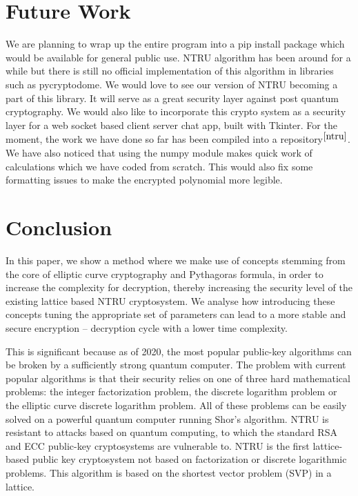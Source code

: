 \documentclass[a4paper,12pt]{article}
\begin{document}
\section{Future Work}
\begin{flushleft}
We are planning to wrap up the entire program into a pip install package which would be available for general public use. NTRU algorithm has been around for a while but there is still no official implementation of this algorithm in libraries such as pycryptodome. We would love to see our version of NTRU becoming a part of this library. It will serve as a great security layer against post quantum cryptography. We would also like to incorporate this crypto system as a security layer for a web socket based client server chat app, built with Tkinter. For the moment, the work we have done so far has been compiled into a repository$^{\cite{ntru}}$. We have also noticed that using the numpy module makes quick work of calculations which we have coded from scratch. This would also fix some formatting issues to make the encrypted polynomial more legible.
\end{flushleft}

\section{Conclusion}
\begin{flushleft}
    In this paper, we show a method where we make use of concepts stemming from the core of elliptic curve cryptography and Pythagoras formula, in order to increase the complexity for decryption, thereby increasing the security level of the existing lattice based NTRU cryptosystem. We analyse how introducing these concepts tuning the appropriate set of parameters can lead to a more stable and secure encryption – decryption cycle with a lower time complexity.
\end{flushleft}

\begin{flushleft}
	This is significant because as of 2020, the most popular public-key algorithms can be broken by a sufficiently strong quantum computer. The problem with current popular algorithms is that their security relies on one of three hard mathematical problems: the integer factorization problem, the discrete logarithm problem or the elliptic curve discrete logarithm problem. All of these problems can be easily solved on a powerful quantum computer running Shor’s algorithm. NTRU is resistant to attacks based on quantum computing, to which the standard RSA and ECC public-key cryptosystems are vulnerable to. NTRU is the first lattice-based public key cryptosystem not based on factorization or discrete logarithmic problems. This algorithm is based on the shortest vector problem (SVP) in a lattice.
\end{flushleft}
\end{document}
